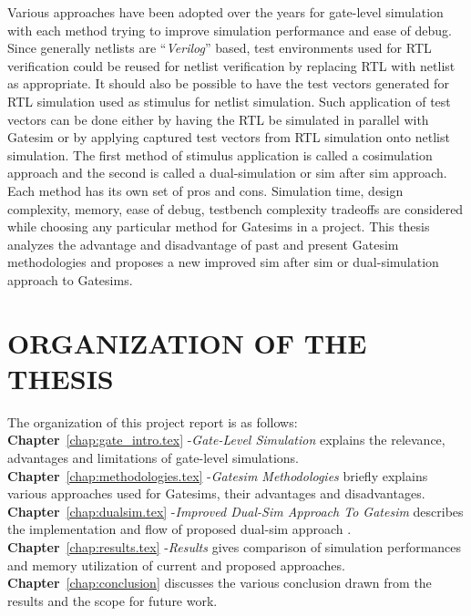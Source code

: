 Various approaches have been adopted over the years for gate-level simulation with each method trying to improve simulation performance and ease of debug. Since generally netlists are ``{\it Verilog}'' based, test environments used for RTL verification could be reused for netlist verification by replacing RTL with netlist as appropriate. It should also be possible to have the test vectors generated for RTL simulation used as stimulus for netlist simulation. Such application of test vectors can be done either by having the RTL be simulated in parallel with Gatesim or by applying captured test vectors from RTL simulation onto netlist simulation. The first method of stimulus application is called a cosimulation approach and the second is called a dual-simulation or sim after sim approach. Each method has its own set of pros and cons. Simulation time, design complexity, memory, ease of debug, testbench complexity tradeoffs are considered while choosing any particular method for Gatesims in a project. This thesis analyzes the advantage and disadvantage of past and present Gatesim methodologies and  proposes a new improved sim after sim or dual-simulation approach to Gatesims. 



\section{ORGANIZATION OF THE THESIS}
The organization of this project report is as follows:\\
\noindent 
{\bf Chapter}~\ref{chap:gate_intro.tex} -{\it Gate-Level Simulation} explains the relevance, advantages and limitations of gate-level simulations.\\
{\bf Chapter}~\ref{chap:methodologies.tex} -{\it Gatesim Methodologies} briefly explains various approaches used for Gatesims, their advantages and disadvantages.\\
{\bf Chapter}~\ref{chap:dualsim.tex} -{\it Improved Dual-Sim Approach To Gatesim} describes the implementation and flow of proposed dual-sim approach .\\
{\bf Chapter}~\ref{chap:results.tex} -{\it Results} gives comparison of simulation performances and memory utilization of current and proposed approaches.\\
{\bf Chapter}~\ref{chap:conclusion} discusses the various conclusion drawn from the results and the scope for future work.
